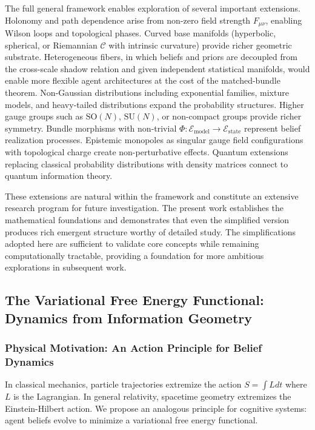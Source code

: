 \documentclass[11pt]{article}
\begin{document}
The full general framework enables exploration of several important extensions. Holonomy and path dependence arise from non-zero field strength $F_{\mu\nu}$, enabling Wilson loops and topological phases. Curved base manifolds (hyperbolic, spherical, or Riemannian $\mathcal{C}$ with intrinsic curvature) provide richer geometric substrate. Heterogeneous fibers, in which beliefs and priors are decoupled from the cross-scale shadow relation and given independent statistical manifolds, would enable more flexible agent architectures at the cost of the matched-bundle theorem. Non-Gaussian distributions including exponential families, mixture models, and heavy-tailed distributions expand the probability structures. Higher gauge groups such as $\mathrm{SO}(N)$, $\mathrm{SU}(N)$, or non-compact groups provide richer symmetry. Bundle morphisms with non-trivial $\Phi: \mathcal{E}_{\mathrm{model}} \to \mathcal{E}_{\mathrm{state}}$ represent belief realization processes. Epistemic monopoles as singular gauge field configurations with topological charge create non-perturbative effects. Quantum extensions replacing classical probability distributions with density matrices connect to quantum information theory.

These extensions are natural within the framework and constitute an extensive research program for future investigation. The present work establishes the mathematical foundations and demonstrates that even the simplified version produces rich emergent structure worthy of detailed study. The simplifications adopted here are sufficient to validate core concepts while remaining computationally tractable, providing a foundation for more ambitious explorations in subsequent work.

\subsection{The Variational Free Energy Functional: Dynamics from Information Geometry}

\subsubsection{Physical Motivation: An Action Principle for Belief Dynamics}

In classical mechanics, particle trajectories extremize the action $S = \int L  dt$ where $L$ is the Lagrangian. In general relativity, spacetime geometry extremizes the Einstein-Hilbert action. We propose an analogous principle for cognitive systems: agent beliefs evolve to minimize a variational free energy functional.
\end{document}
